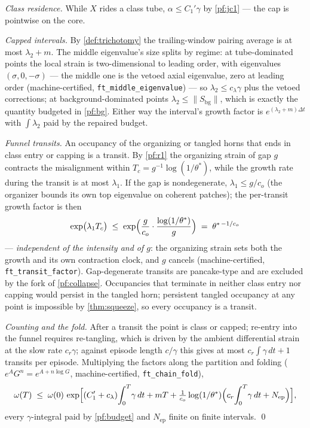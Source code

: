 \documentclass[11pt,letterpaper]{amsart}
\theoremstyle{definition}
\theoremstyle{remark}
\newcommand{\om}{\omega}
\newcommand{\norm}[1]{\lVert #1 \rVert}
\begin{document}
\emph{Class residence.} While $X$ rides a class tube, $\alpha\le C_1'\gamma$ by
\cref{pf:jc1} --- the cap is pointwise on the core.

\emph{Capped intervals.} By \cref{def:trichotomy} the trailing-window pairing average
is at most $\lambda_2+m$. The middle eigenvalue's size splits by regime: at
tube-dominated points the local strain is two-dimensional to leading order, with
eigenvalues $(\sigma,0,-\sigma)$ --- the middle one is the vetoed axial eigenvalue,
zero at leading order (machine-certified, \texttt{ft\_middle\_eigenvalue}) --- so
$\lambda_2\le c_\lambda\gamma$ plus the vetoed corrections; at background-dominated
points $\lambda_2\le\norm{S_{\mathrm{bg}}}$, which is exactly the quantity budgeted
in \cref{pf:bg}. Either way the interval's growth factor is
$e^{(\lambda_2+m)\Delta t}$ with $\int\lambda_2$ paid by the repaired budget.

\emph{Funnel transits.} An occupancy of the organizing or tangled horns that ends in
class entry or capping is a transit. By \cref{pf:r1} the organizing strain of gap $g$
contracts the misalignment within $T_c=g^{-1}\log(1/\theta^*)$, while the growth rate
during the transit is at most $\lambda_1$. If the gap is nondegenerate,
$\lambda_1\le g/c_o$ (the organizer bounds its own top eigenvalue on coherent
patches); the per-transit growth factor is then
\[
\exp\bigl(\lambda_1T_c\bigr)\;\le\;
\exp\Bigl(\frac{g}{c_o}\cdot\frac{\log(1/\theta^*)}{g}\Bigr)
\;=\;\theta^{*\,-1/c_o}
\]
--- \emph{independent of the intensity and of $g$}: the organizing strain sets both
the growth and its own contraction clock, and $g$ cancels (machine-certified,
\texttt{ft\_transit\_factor}). Gap-degenerate transits are pancake-type and are
excluded by the fork of \cref{pf:collapse}. Occupancies that terminate in neither
class entry nor capping would persist in the tangled horn; persistent tangled
occupancy at any point is impossible by \cref{thm:squeeze}, so every occupancy is a
transit.

\emph{Counting and the fold.} After a transit the point is class or capped; re-entry
into the funnel requires re-tangling, which is driven by the ambient differential
strain at the slow rate $c_r\gamma$; against episode length $c/\gamma$ this gives at
most $c_r\int\gamma\,dt+1$ transits per episode. Multiplying the factors along the
partition and folding ($e^{A}G^{n}=e^{A+n\log G}$, machine-certified,
\texttt{ft\_chain\_fold}),
\[
\om(T)\;\le\;\om(0)\,
\exp\Bigl[(C_1'+c_\lambda)\!\int_0^T\!\gamma\,dt+mT
+\tfrac{1}{c_o}\log(1/\theta^*)\Bigl(c_r\!\int_0^T\!\gamma\,dt+N_{\mathrm{ep}}\Bigr)\Bigr],
\]
every $\gamma$-integral paid by \cref{pf:budget} and $N_{\mathrm{ep}}$ finite on
finite intervals. \qed
\end{document}

